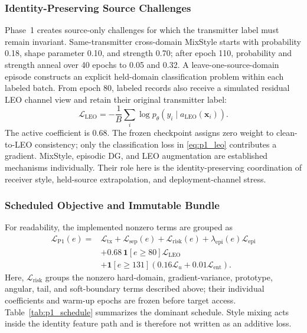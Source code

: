 \documentclass[journal]{IEEEtran}
\begin{document}
\subsubsection{Identity-Preserving Source Challenges}

Phase~1 creates source-only challenges for which the transmitter label must remain invariant. Same-transmitter cross-domain MixStyle starts with probability 0.18, shape parameter 0.10, and strength 0.70; after epoch 110, probability and strength anneal over 40 epochs to 0.05 and 0.32. A leave-one-source-domain episode constructs an explicit held-domain classification problem within each labeled batch. From epoch 80, labeled records also receive a simulated residual LEO channel view and retain their original transmitter label:
\begin{equation}
\mathcal{L}_{\mathrm{LEO}}
=-\frac{1}{B}\sum_i
\log p_{\theta}
\!\left(y_i\mid a_{\mathrm{LEO}}(\mathbf{x}_i)\right).
\label{eq:p1_leo}
\end{equation}
The active coefficient is 0.68. The frozen checkpoint assigns zero weight to clean-to-LEO consistency; only the classification loss in \eqref{eq:p1_leo} contributes a gradient. MixStyle, episodic DG, and LEO augmentation are established mechanisms individually. Their role here is the identity-preserving coordination of receiver style, held-source extrapolation, and deployment-channel stress.

\subsubsection{Scheduled Objective and Immutable Bundle}

For readability, the implemented nonzero terms are grouped as
\begin{equation}
\begin{aligned}
\mathcal{L}_{\mathrm{P1}}(e)
={}&\mathcal{L}_{\mathrm{tx}}
+\mathcal{L}_{\mathrm{sep}}(e)
+\mathcal{L}_{\mathrm{risk}}(e)
+\lambda_{\mathrm{epi}}(e)\mathcal{L}_{\mathrm{epi}}\\
&+0.68\,\mathbf{1}[e\geq80]\mathcal{L}_{\mathrm{LEO}}\\
&+\mathbf{1}[e\geq131]
\left(0.16\mathcal{L}_{u}
+0.01\mathcal{L}_{\mathrm{ent}}\right).
\end{aligned}
\label{eq:p1loss}
\end{equation}
Here, \(\mathcal{L}_{\mathrm{risk}}\) groups the nonzero hard-domain, gradient-variance, prototype, angular, tail, and soft-boundary terms described above; their individual coefficients and warm-up epochs are frozen before target access. Table~\ref{tab:p1_schedule} summarizes the dominant schedule. Style mixing acts inside the identity feature path and is therefore not written as an additive loss.
\end{document}

